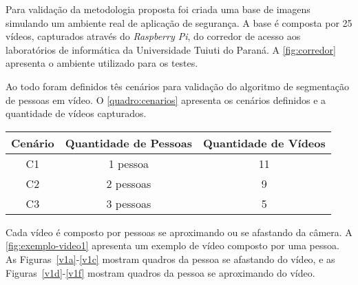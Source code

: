 \documentclass[12pt,oneside,a4paper,chapter=TITLE,section=TITLE,sumario=tradicional]{abntex2}
\begin{document}
Para validação da metodologia proposta foi criada uma base de imagens simulando um ambiente real de aplicação de segurança. A base é composta por 25 vídeos, capturados através do \textit{Raspberry Pi}, do corredor de acesso aos laboratórios de informática da Universidade Tuiuti do Paraná. A \autoref{fig:corredor} apresenta o ambiente utilizado para os testes.

\begin{figure}[htb]
    \fonteautor
\end{figure}

Ao todo foram definidos tês cenários para validação do algoritmo de segmentação de pessoas em vídeo. O \autoref{quadro:cenarios} apresenta os cenários definidos e a quantidade de vídeos capturados.

\begin{quadro}[htb]
    \begin{tabular}{|c|c|c|}
        \hline
        \textbf{Cenário} & \textbf{Quantidade de Pessoas} & \textbf{Quantidade de Vídeos} \\\hline 
          C1 & 1 pessoa  &  11 \\\hline
          C2 & 2 pessoas &  9 \\\hline
          C3 & 3 pessoas &  5 \\\hline
              \hline

    \end{tabular}
    
    \fonteautor
\end{quadro}


Cada vídeo é composto por pessoas se aproximando ou se afastando da câmera. A \autoref{fig:exemplo-video1} apresenta um exemplo de vídeo composto por uma pessoa. As Figuras~\ref{v1a}-\ref{v1c} mostram quadros da pessoa se afastando do vídeo, e as Figuras~\ref{v1d}-\ref{v1f} mostram quadros da pessoa se aproximando do vídeo.

\begin{figure}[htb]
    \hfil
    \hfil

    \hfil
    \hfil
    
    \fonteautor
\end{figure}
\end{document}
